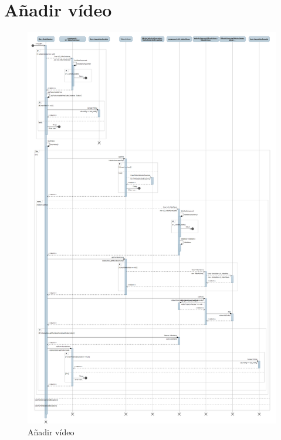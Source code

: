 \section{A\~nadir v\'ideo}
\begin{figure}[H]
\centering
\includegraphics[width=0.8\linewidth]{./Figures/Secuencia/AddVideo}
\caption{A\~nadir v\'ideo}
\label{fig:AddVideo}
\end{figure}

